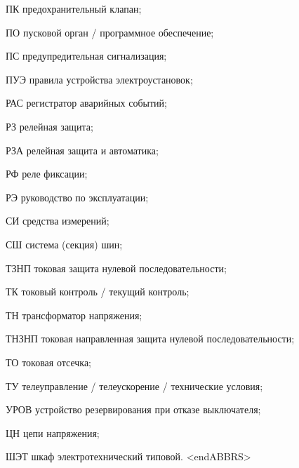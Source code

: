 \begin{list}{}
\item[ПК] предохранительный клапан;
\item[ПО] пусковой орган / программное обеспечение;
\item[ПС] предупредительная сигнализация;
\item[ПУЭ] правила устройства электроустановок;
\item[РАС] регистратор аварийных событий;
\item[РЗ] релейная защита;
\item[РЗА] релейная защита и автоматика;
\item[РФ] реле фиксации;
\item[РЭ] руководство по эксплуатации;
\item[СИ] средства измерений;
\item[СШ] система (секция) шин;
\item[ТЗНП] токовая защита нулевой последовательности;
\item[ТК] токовый контроль / текущий контроль;
\item[ТН] трансформатор напряжения;
\item[ТНЗНП] токовая направленная защита нулевой последовательности;
\item[ТО] токовая отсечка;
\item[ТУ] телеуправление / телеускорение / технические условия;
\item[УРОВ] устройство резервирования при отказе выключателя;
\item[ЦН] цепи напряжения;
\item[ШЭТ] шкаф электротехнический типовой.
{\color{white}\fontsize{0.1pt}{0.1pt}\selectfont<endABBRS>}
\end{list}
